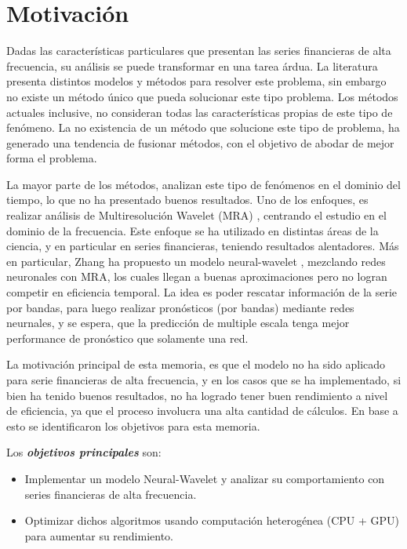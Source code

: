 \section{Motivación}

Dadas las características particulares que presentan las series financieras de
alta frecuencia, su análisis se puede transformar en una tarea árdua. La
literatura presenta distintos modelos y métodos para resolver este problema,
sin embargo no existe un método único que pueda solucionar este tipo problema.
Los métodos actuales inclusive, no consideran todas las características propias
de este tipo de fenómeno. La no existencia de un método que solucione este tipo
de problema, ha generado una tendencia de fusionar métodos, con el objetivo de
abodar de mejor forma el problema.

La mayor parte de los métodos, analizan este tipo de fenómenos en el dominio
del tiempo, lo que no ha presentado buenos resultados.  Uno de los enfoques, es
realizar análisis de Multiresolución Wavelet (MRA) \cite{benaouda2006wavelet},
centrando el estudio en el dominio de la frecuencia.  Este enfoque se ha
utilizado en distintas áreas de la ciencia, y en particular en series
financieras, teniendo resultados alentadores. Más en particular, Zhang ha
propuesto un modelo neural-wavelet \cite{zhang2001adaptive}, mezclando redes
neuronales con MRA, los cuales llegan a buenas aproximaciones pero no logran
competir en eficiencia temporal. La idea es poder rescatar información de la
serie por bandas, para luego realizar pronósticos (por bandas) mediante redes
neurnales, y se espera, que la predicción de multiple escala tenga mejor
performance de pronóstico que solamente una red. 

La motivación principal de esta memoria, es que el modelo no ha sido aplicado
para serie financieras de alta frecuencia, y en los casos que se ha
implementado, si bien ha tenido buenos resultados, no ha logrado tener buen
rendimiento a nivel de eficiencia, ya que el proceso involucra una alta
cantidad de cálculos. En base a esto se identificaron los objetivos para esta
memoria.

Los \emph{\textbf{objetivos principales}} son:
\begin{itemize}
	\item Implementar un modelo Neural-Wavelet y analizar su comportamiento con
series financieras de alta frecuencia.
	\item Optimizar dichos algoritmos usando computación heterogénea (CPU +
GPU) para aumentar su rendimiento.
\end{itemize} 

